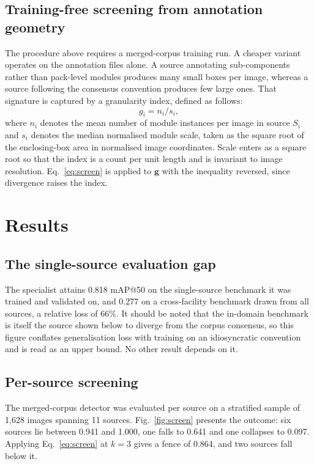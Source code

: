 \documentclass[conference]{IEEEtran}
\begin{document}
\subsection{Training-free screening from annotation geometry}
\label{sec:screen-free}
The procedure above requires a merged-corpus training run. A cheaper variant
operates on the annotation files alone. A source annotating sub-components rather
than pack-level modules produces many small boxes per image, whereas a source
following the consensus convention produces few large ones. That signature is
captured by a granularity index, defined as follows:
\begin{equation}
g_i = n_i / s_i ,
\label{eq:granularity}
\end{equation}
where $n_i$ denotes the mean number of module instances per image in source $S_i$
and $s_i$ denotes the median normalised module scale, taken as the square root of
the enclosing-box area in normalised image coordinates. Scale enters as a square
root so that the index is a count per unit length and is invariant to image
resolution. Eq.~\ref{eq:screen} is applied to $\mathbf{g}$ with the inequality
reversed, since divergence raises the index.

\section{Results}

\subsection{The single-source evaluation gap}
\label{sec:res-gap}
The specialist attains 0.818 mAP@50 on the single-source benchmark it was trained and
validated on, and 0.277 on a cross-facility benchmark drawn from all sources, a
relative loss of 66\%. It should be noted that the in-domain benchmark is itself the
source shown below to diverge from the corpus consensus, so this figure conflates
generalisation loss with training on an idiosyncratic convention and is read as an
upper bound. No other result depends on it.

\subsection{Per-source screening}
\label{sec:res-screen}
The merged-corpus detector was evaluated per source on a stratified sample of 1,628
images spanning 11 sources. Fig.~\ref{fig:screen} presents the outcome: six sources
lie between 0.941 and 1.000, one falls to 0.641 and one collapses to 0.097. Applying
Eq.~\ref{eq:screen} at $k=3$ gives a fence of 0.864, and two sources fall below it.
\end{document}
